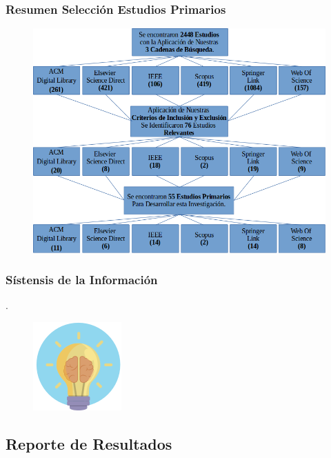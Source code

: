 \documentclass{beamer}
\begin{document}
\begin{frame}
	\frametitle{Resumen Selección Estudios Primarios}
	\begin{figure}
		\begin{center}
			\includegraphics[scale=0.35]{images/1document/results.png}
		\end{center}
	\end{figure}
\end{frame}

\begin{frame}
    \frametitle{Sístensis de la Información}
    .
	\begin{figure}
		\begin{center}
			\includegraphics[scale=0.45]{images/2icons/need.png}
			
		\end{center}
	\end{figure}
\end{frame}

\subsection{Reporte de Resultados} %
\end{document}
